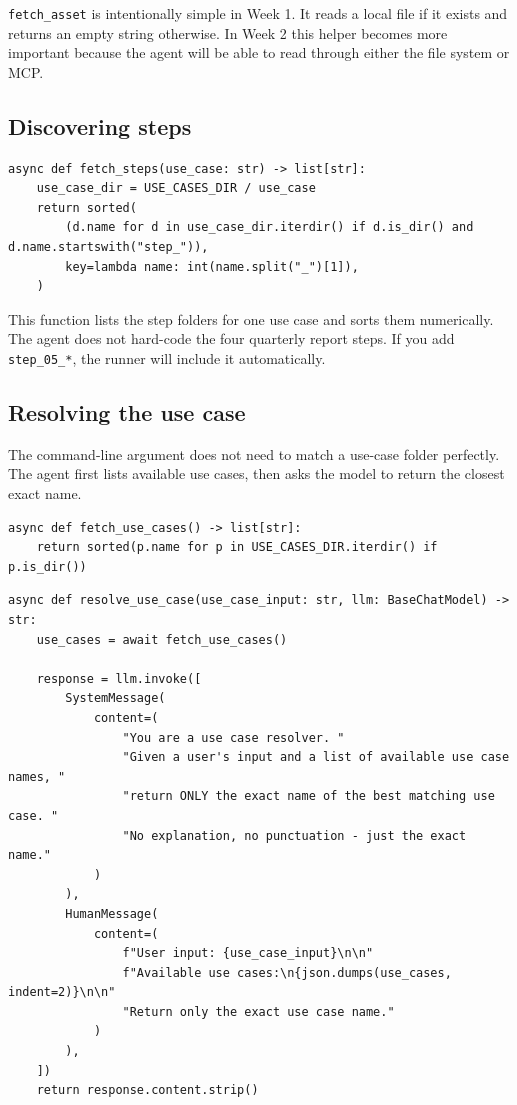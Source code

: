 \documentclass[12pt, a4paper]{article}
\begin{document}
\texttt{fetch\_asset} is intentionally simple in Week 1. It reads a local file if it exists and returns an empty string otherwise. In Week 2 this helper becomes more important because the agent will be able to read through either the file system or MCP.

\subsection{Discovering steps}

\begin{lstlisting}[style=pythonstyle]
async def fetch_steps(use_case: str) -> list[str]:
    use_case_dir = USE_CASES_DIR / use_case
    return sorted(
        (d.name for d in use_case_dir.iterdir() if d.is_dir() and d.name.startswith("step_")),
        key=lambda name: int(name.split("_")[1]),
    )
\end{lstlisting}

This function lists the step folders for one use case and sorts them numerically. The agent does not hard-code the four quarterly report steps. If you add \texttt{step\_05\_*}, the runner will include it automatically.

\subsection{Resolving the use case}

The command-line argument does not need to match a use-case folder perfectly. The agent first lists available use cases, then asks the model to return the closest exact name.

\begin{lstlisting}[style=pythonstyle]
async def fetch_use_cases() -> list[str]:
    return sorted(p.name for p in USE_CASES_DIR.iterdir() if p.is_dir())
\end{lstlisting}

\begin{lstlisting}[style=pythonstyle]
async def resolve_use_case(use_case_input: str, llm: BaseChatModel) -> str:
    use_cases = await fetch_use_cases()

    response = llm.invoke([
        SystemMessage(
            content=(
                "You are a use case resolver. "
                "Given a user's input and a list of available use case names, "
                "return ONLY the exact name of the best matching use case. "
                "No explanation, no punctuation - just the exact name."
            )
        ),
        HumanMessage(
            content=(
                f"User input: {use_case_input}\n\n"
                f"Available use cases:\n{json.dumps(use_cases, indent=2)}\n\n"
                "Return only the exact use case name."
            )
        ),
    ])
    return response.content.strip()
\end{lstlisting}
\end{document}
